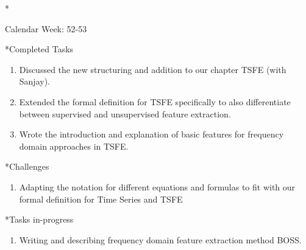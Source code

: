 \documentclass[11pt,a4paper]{article}
\begin{document}
\newpage
\begin{section}*{Calendar Week: 52-53 \hfill \date{30 December, 2020}}
	
	\begin{subsection}*{Completed Tasks}
		\begin{enumerate}
			\item Discussed the new structuring and addition to our chapter TSFE (with Sanjay).
			\item Extended the formal definition for TSFE specifically to also differentiate between supervised and unsupervised feature extraction.
			\item Wrote the introduction and explanation of basic features for frequency domain approaches in TSFE.
		\end{enumerate}
	\end{subsection}
	
	\begin{subsection}*{Challenges}
		\begin{enumerate}
			\item Adapting the notation for different equations and formulas to fit with our formal definition for Time Series and TSFE
		\end{enumerate}
	\end{subsection}
	
	\begin{subsection}*{Tasks in-progress}
		\begin{enumerate}
			\item Writing and describing frequency domain feature extraction method BOSS.
		\end{enumerate}
	\end{subsection}
\end{section}
\end{document}
